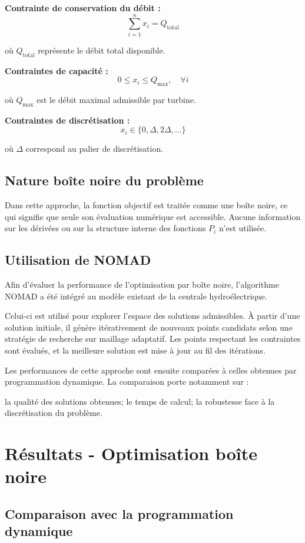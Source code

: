 \documentclass[12pt, letterpaper]{report}
\begin{document}
\textbf{Contrainte de conservation du débit :}
\[
\sum_{i=1}^{n} x_i = Q_{\text{total}}
\]

où \( Q_{\text{total}} \) représente le débit total disponible.

\textbf{Contraintes de capacité :}
\[
0 \le x_i \le Q_{\max}, \quad \forall i
\]

où \( Q_{\max} \) est le débit maximal admissible par turbine.

\textbf{Contraintes de discrétisation :}
\[
x_i \in \{0, \Delta, 2\Delta, \ldots\}
\]

où \( \Delta \) correspond au palier de discrétisation.


\section{Nature boîte noire du problème}
Dans cette approche, la fonction objectif est traitée comme une boîte noire, ce qui signifie que seule son évaluation numérique est accessible. Aucune information sur les dérivées ou sur la structure interne des fonctions \(P_i\) n'est utilisée.

\section{Utilisation de NOMAD}
Afin d'évaluer la performance de l'optimisation par boîte noire, l'algorithme NOMAD\cite{ledigabel2011nomad} a été intégré au modèle existant de la centrale hydroélectrique.

Celui-ci est utilisé pour explorer l'espace des solutions admissibles. À partir d'une solution initiale, il génère itérativement de nouveaux points candidats selon une stratégie de recherche sur maillage adaptatif. Les points respectant les contraintes sont évalués, et la meilleure solution est mise à jour au fil des itérations.

Les performances de cette approche sont ensuite comparées à celles obtenues par programmation dynamique. La comparaison porte notamment sur :

la qualité des solutions obtenues;
le temps de calcul;
la robustesse face à la discrétisation du problème.


\chapter{Résultats - Optimisation boîte noire}

\section{Comparaison avec la programmation dynamique}
\end{document}
